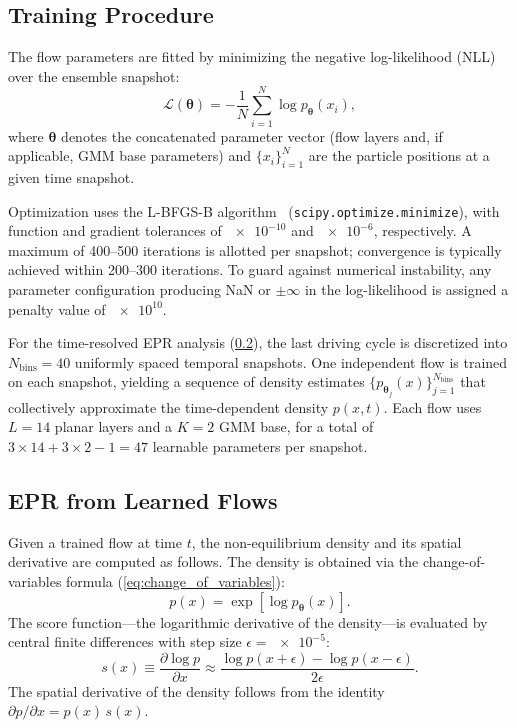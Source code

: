 \subsection{Training Procedure}
\label{sec:training}

The flow parameters are fitted by minimizing the negative log-likelihood (NLL) over the ensemble snapshot:
\begin{equation}
    \mathcal{L}(\boldsymbol{\theta}) = -\frac{1}{N}\sum_{i=1}^{N}\log p_{\boldsymbol{\theta}}(x_i),
    \label{eq:nll_loss}
\end{equation}
where $\boldsymbol{\theta}$ denotes the concatenated parameter vector (flow layers and, if applicable, GMM base parameters) and $\{x_i\}_{i=1}^N$ are the particle positions at a given time snapshot.

Optimization uses the L-BFGS-B algorithm~\cite{Byrd1995} (\texttt{scipy.\allowbreak optimize.\allowbreak minimize}), with function and gradient tolerances of $\num{e-10}$ and $\num{e-6}$, respectively.
A maximum of \num{400}--\num{500} iterations is allotted per snapshot; convergence is typically achieved within \num{200}--\num{300} iterations.
To guard against numerical instability, any parameter configuration producing NaN or $\pm\infty$ in the log-likelihood is assigned a penalty value of $\num{e10}$.

For the time-resolved EPR analysis (\cref{sec:epr_from_nf}), the last driving cycle is discretized into $N_{\mathrm{bins}} = 40$ uniformly spaced temporal snapshots.
One independent flow is trained on each snapshot, yielding a sequence of density estimates $\{p_{\boldsymbol{\theta}_j}(x)\}_{j=1}^{N_{\mathrm{bins}}}$ that collectively approximate the time-dependent density $p(x,t)$.
Each flow uses $L = 14$ planar layers and a $K = 2$ GMM base, for a total of $3 \times 14 + 3 \times 2 - 1 = 47$ learnable parameters per snapshot.


\subsection{EPR from Learned Flows}
\label{sec:epr_from_nf}

Given a trained flow at time $t$, the non-equilibrium density and its spatial derivative are computed as follows.
The density is obtained via the change-of-variables formula (\cref{eq:change_of_variables}):
\begin{equation}
    p(x) = \exp\!\left[\log p_{\boldsymbol{\theta}}(x)\right].
    \label{eq:nf_density}
\end{equation}
The score function---the logarithmic derivative of the density---is evaluated by central finite differences with step size $\epsilon = \num{e-5}$:
\begin{equation}
    s(x) \equiv \frac{\partial\log p}{\partial x} \approx \frac{\log p(x + \epsilon) - \log p(x - \epsilon)}{2\epsilon}.
    \label{eq:score_function}
\end{equation}
The spatial derivative of the density follows from the identity $\partial p/\partial x = p(x)\,s(x)$.

